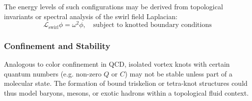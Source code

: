 The energy levels of such configurations may be derived from topological invariants or spectral analysis of the swirl field Laplacian:
\[
\mathcal{L}_{\text{swirl}} \phi = \omega^2 \phi, \quad \text{subject to knotted boundary conditions}
\]

\subsubsection*{Confinement and Stability}

Analogous to color confinement in QCD, isolated vortex knots with certain quantum numbers (e.g. non-zero $Q$ or $C$) may not be stable unless part of a molecular state. The formation of bound triskelion or tetra-knot structures could thus model baryons, mesons, or exotic hadrons within a topological fluid context.

